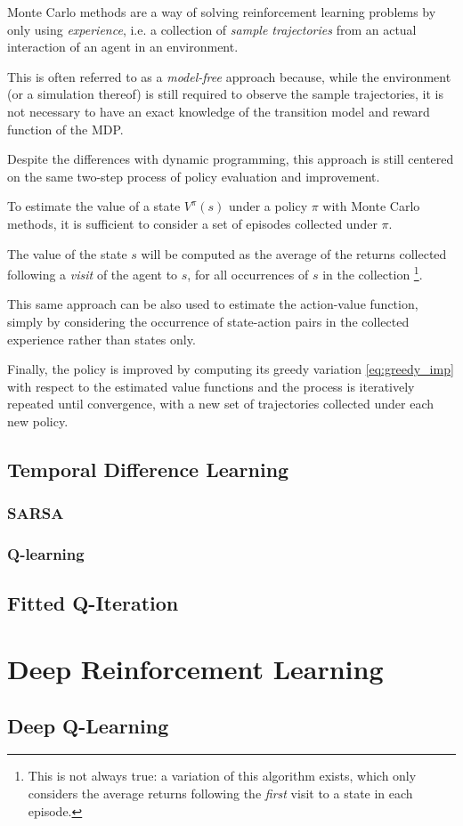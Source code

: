Monte Carlo methods are a way of solving reinforcement learning problems by 
only using \textit{experience}, i.e. a collection of \textit{sample trajectories}
from an actual interaction of an agent in an environment.

This is often referred to as a \textit{model-free} approach because, while the
environment (or a simulation thereof) is still required to observe the sample
trajectories, it is not necessary to have an exact knowledge of the transition 
model and reward function of the MDP. 

Despite the differences with dynamic programming, this approach is still 
centered on the same two-step process of policy evaluation and improvement.

To estimate the value of a state $V^\pi(s)$ under a policy $\pi$ with Monte 
Carlo methods, it is sufficient to consider a set of episodes collected under 
$\pi$.

The value of the state $s$ will be computed as the average of the returns 
collected following a \textit{visit} of the agent to $s$, for all occurrences of
$s$ in the collection \footnote{This is not always true: a variation of this 
algorithm exists, which only considers the average returns following the 
\textit{first} visit to a state in each episode.}.

This same approach can be also used to estimate the action-value function, simply
by considering the occurrence of state-action pairs in the collected experience
rather than states only. 

Finally, the policy is improved by computing its greedy variation \eqref{eq:greedy_imp}
with respect to the estimated value functions and the process is iteratively
repeated until convergence, with a new set of trajectories collected under each 
new policy.

\subsection{Temporal Difference Learning}

\subsubsection{SARSA}

\subsubsection{Q-learning}

\subsection{Fitted Q-Iteration}


\section{Deep Reinforcement Learning} \label{s:DRL}

\subsection{Deep Q-Learning}



